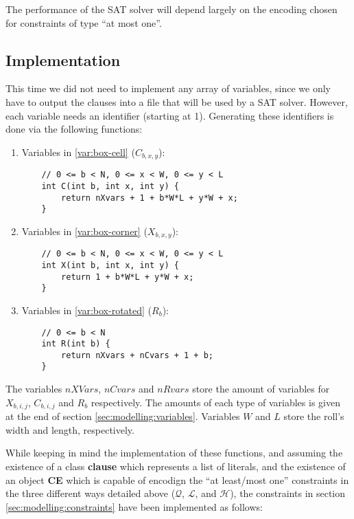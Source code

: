 The performance of the SAT solver will depend largely on the
encoding chosen for constraints of type ``at most one''.

\subsection{Implementation}
\label{sec:satisfiability:implementation}

This time we did not need to implement any array of variables, since
we only have to output the clauses into a file that will be used by a
SAT solver. However, each variable needs an identifier (starting at 1).
Generating these identifiers is done via the following functions:

\begin{enumerate}
	\item Variables in \ref{var:box-cell} ($C_{b,x,y}$):
    
	{\NOINDENT \begin{lstlisting}
	// 0 <= b < N, 0 <= x < W, 0 <= y < L
	int C(int b, int x, int y) {
		return nXvars + 1 + b*W*L + y*W + x;
	}
	\end{lstlisting}}
    
	\item Variables in \ref{var:box-corner} ($X_{b,x,y}$):
    
	{\NOINDENT \begin{lstlisting}
	// 0 <= b < N, 0 <= x < W, 0 <= y < L
	int X(int b, int x, int y) {
		return 1 + b*W*L + y*W + x;
	}
	\end{lstlisting}}
    
	\item Variables in \ref{var:box-rotated} ($R_b$):
    
	{\NOINDENT \begin{lstlisting}
	// 0 <= b < N
	int R(int b) {
		return nXvars + nCvars + 1 + b;
	}
	\end{lstlisting}}
\end{enumerate}

The variables $nXVars$, $nCvars$ and $nRvars$ store the amount of
variables for $X_{b,i,j}$, $C_{b,i,j}$ and $R_b$ respectively. The
amounts of each type of variables is given at the end of section
\ref{sec:modelling:variables}. Variables $W$ and $L$ store the
roll's width and length, respectively.

\hfill

While keeping in mind the implementation of these functions, and
assuming the existence of a class \textbf{clause} which represents a list
of literals, and the existence of an object \textbf{CE} which is capable
of encodign the ``at least/most one'' constraints in the three
different ways detailed above ($\mathcal{Q}$, $\mathcal{L}$, and
$\mathcal{H}$), the constraints in section \ref{sec:modelling:constraints}
have been implemented as follows:

